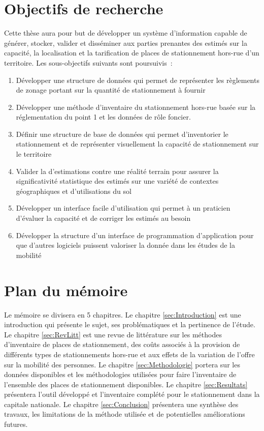 \section{Objectifs de recherche}  \label{sec:obj_recherche}%
Cette thèse aura pour but de développer un système d'information capable de générer, stocker, valider et disséminer aux parties prenantes des estimés sur la capacité, la localisation et la tarification de places de stationnement hors-rue d'un territoire. Les sous-objectifs suivants sont poursuivis :

\begin{enumerate}
\item Développer une structure de données qui permet de représenter les règlements de zonage portant sur la quantité de stationnement à fournir
\item Développer une méthode d'inventaire du stationnement hors-rue basée sur la réglementation du point 1 et les données de rôle foncier.
\item Définir une structure de base de données qui permet d'inventorier le stationnement et de représenter visuellement la capacité de stationnement sur le territoire
\item Valider la d'estimations contre une réalité terrain pour assurer la significativité statistique des estimés sur une variété de contextes géographiques et d'utilisations du sol
\item Développer un interface facile d'utilisation qui permet à un praticien d'évaluer la capacité et de corriger les estimés au besoin
\item Développer la structure d'un interface de programmation d'application pour que d'autres logiciels puissent valoriser la donnée dans les études de la mobilité
\end{enumerate}

\section{Plan du mémoire}  %

Le mémoire se divisera en 5 chapitres. Le chapitre \ref{sec:Introduction} est une introduction qui présente le sujet, ses problématiques et la pertinence de l'étude. Le chapitre \ref{sec:RevLitt} est une revue de littérature sur les méthodes d'inventaire de places de stationnement, des coûts associés à la provision de différents types de stationnements hors-rue et aux effets de la variation de l'offre sur la mobilité des personnes. Le chapitre \ref{sec:Methodologie} portera sur les données disponibles et les méthodologies utilisées pour faire l'inventaire de l'ensemble des places de stationnement disponibles. Le chapitre \ref{sec:Resultats} présentera l'outil développé et l'inventaire complété pour le stationnement dans la capitale nationale. Le chapitre \ref{sec:Conclusion} présentera une synthèse des travaux, les limitations de la méthode utilisée et de potentielles améliorations futures.

\clearpage
